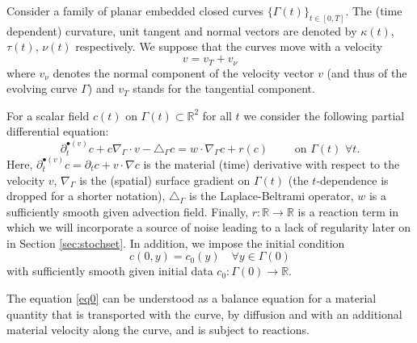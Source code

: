\documentclass[a4paper,10pt]{article}
\newcommand{\R}{\mathbb{R}}
\numberwithin{equation}{section}
\begin{document}
Consider a family of planar embedded 
closed curves $\{\Gamma(t)\}_{t \in [0,T]}$.
The (time dependent) curvature, unit tangent and normal vectors are denoted by $\kappa(t)$, $\tau(t)$, $\nu(t)$ respectively. We suppose that the curves move with a velocity
$$ v = v_{T} + v_{\nu} $$
where $v_{\nu}$ denotes the normal component of the velocity vector $v$ (and thus of the evolving curve $\Gamma$) and $v_{T}$ stands for the tangential component.

For a scalar field $c(t)$ on $\Gamma(t) \subset \R^{2}$ for all $t$ we consider the following partial differential equation:
\begin{equation}\label{eq0}
 \partial_{t}^{\bullet (v)} c + c \nabla_{\Gamma} \cdot v - \triangle_{\Gamma} c = w \cdot \nabla_{\Gamma} c + r(c) \qquad \text{ on } \Gamma(t) \, \,\forall t.
\end{equation}
Here, $\partial_{t}^{\bullet (v)} c = \partial_{t} c + v \cdot \nabla c$ is the material (time) derivative with respect to the velocity $v$, $\nabla_{\Gamma}$ is the (spatial) surface gradient on $\Gamma(t)$ (the $t$-dependence is dropped for a shorter notation), $\triangle_{\Gamma}$ is the Laplace-Beltrami operator, $w$ is a sufficiently smooth given advection field.
Finally, $r : \R \to \R$ is a reaction term in which we will incorporate a source of noise leading to a lack of regularity later on in Section \ref{sec:stochset}.
In addition, we impose the initial condition
\begin{equation} \label{eq0ic}
 c(0,y)=c_{0}(y) \quad \forall y \in \Gamma(0)
\end{equation}
with sufficiently smooth given initial data $c_{0} : \Gamma(0) \to \R$.

The equation \eqref{eq0} can be understood as a balance equation for a material quantity that is transported with the curve, by diffusion and with an additional material velocity along the curve, and is subject to reactions.
\end{document}
